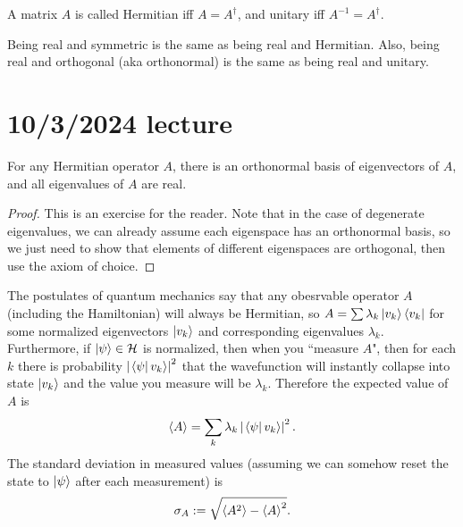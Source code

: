 \documentclass{article}
\begin{document}
\par
A matrix $A$ is called Hermitian iff $A=A^\dag$, and unitary iff $A^{-1}=A^\dag$.
\begin{cor}
    Being real and symmetric is the same as being real and Hermitian. Also, being real and orthogonal (aka orthonormal) is the same as being real and unitary.
\end{cor}

\section{10/3/2024 lecture}
\begin{thm}
    For any Hermitian operator $A$, there is an orthonormal basis of eigenvectors of $A$, and all eigenvalues of $A$ are real.
\end{thm}
\begin{proof}
    This is an exercise for the reader. Note that in the case of degenerate eigenvalues, we can already assume each eigenspace has an orthonormal basis, so we just need to show that elements of different eigenspaces are orthogonal, then use the axiom of choice.
\end{proof}
The postulates of quantum mechanics say that any obesrvable operator $A$ (including the Hamiltonian) will always be Hermitian, so $A=\sum \lambda_k \left\lvert v_k \right\rangle\left\langle v_k \right\rvert$ for some normalized eigenvectors $\left\lvert v_k \right\rangle$ and corresponding eigenvalues $\lambda_k$. Furthermore, if $\left\lvert \psi \right\rangle \in \mathcal{H}$ is normalized, then when you ``measure $A$", then for each $k$ there is probability $\left\lvert \left.\left\langle \psi\right\vert v_k \right\rangle \right\rvert^2$ that the wavefunction will instantly collapse into state $\left\lvert v_k \right\rangle$ and the value you measure will be $\lambda_k$. Therefore the expected value of $A$ is
\[ \left\langle A \right\rangle = \sum_k \lambda_k \left\lvert \left.\left\langle \psi\right\vert v_k \right\rangle \right\rvert^2. \]
The standard deviation in measured values (assuming we can somehow reset the state to $\left\lvert \psi \right\rangle$ after each measurement) is
\[ \sigma_A := \sqrt{\left\langle A^2 \right\rangle-\left\langle A \right\rangle^2}. \]
\end{document}
